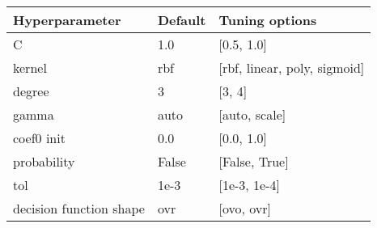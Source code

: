 
\begin{tabular}{|l|l|l|} 
\hline
\textbf{Hyperparameter}& \textbf{Default} & \textbf{Tuning options}\\
\hline
C & 1.0 & [0.5, 1.0] \\
\hline
kernel & rbf & [rbf, linear, poly, sigmoid] \\
\hline
degree & 3 & [3, 4] \\
\hline
gamma & auto& [auto, scale] \\
\hline
coef0 init & 0.0 & [0.0, 1.0] \\
\hline
probability & False & [False, True] \\
\hline
tol & 1e-3& [1e-3, 1e-4] \\
\hline
decision function shape & ovr & [ovo, ovr] \\
\hline
\end{tabular}
